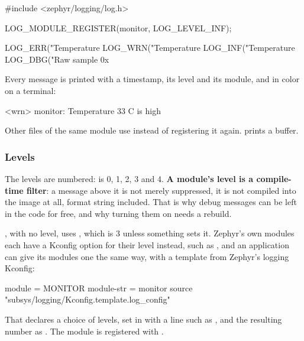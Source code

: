 \begin{ccode}
#include <zephyr/logging/log.h>

LOG_MODULE_REGISTER(monitor, LOG_LEVEL_INF);

LOG_ERR("Temperature %
LOG_WRN("Temperature %
LOG_INF("Temperature %
LOG_DBG("Raw sample 0x%
\end{ccode}

\noindent Every message is printed with a timestamp, its level and its module, and in color on a
terminal:

\begin{console}
[00:00:01.530,000] <wrn> monitor: Temperature 33 C is high
\end{console}

\noindent Other files of the same module use 
instead of registering it again.  prints a buffer.

\subsubsection{Levels}
The levels are numbered:  is 0,  1,  2,  3 and
 4. \textbf{A module’s level is a compile-time filter}: a message above it is not merely
suppressed, it is not compiled into the image at all, format string included. That is why debug
messages can be left in the code for free, and why turning them on needs a rebuild.

, with no level, uses , which is 3
unless something sets it. Zephyr’s own modules each have a Kconfig option for their level instead,
such as , and an application can give its modules one the same way, with
a template from Zephyr’s logging Kconfig:

\begin{kconfigcode}
module = MONITOR
module-str = monitor
source "subsys/logging/Kconfig.template.log_config"
\end{kconfigcode}

\noindent That declares a choice of levels, set in  with a line such as
, and the resulting number as .
The module is registered with .


